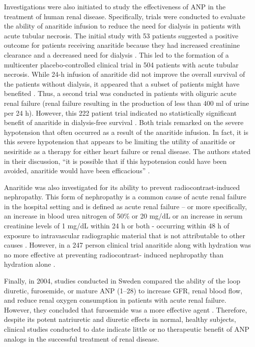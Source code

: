 \documentclass[14pt,a4paper,onecolumn]{article}
\begin{document}
Investigations were also initiated to study the effectiveness of ANP in the treatment of human renal disease. Specifically, trials were conducted to evaluate the ability of anaritide infusion to reduce the need for dialysis in patients with acute tubular necrosis. The initial study with 53 patients suggested a positive outcome for patients receiving anaritide because they had increased creatinine clearance and a decreased need for dialysis \citep{Rahman1994}. This led to the formation of a multicenter placebo-controlled clinical trial in 504 patients with acute tubular necrosis. While 24-h infusion of anaritide did not improve the overall survival of the patients without dialysis, it appeared that a subset of patients might have benefited \citep{Allgren1997}.
Thus, a second trial was conducted in patients with oliguric acute renal failure (renal failure resulting in the production of less than 400 ml of urine per 24 h). However, this 222 patient trial indicated no statistically significant benefit of anaritide in dialysis-free survival \citep{Lewis2000}. Both trials remarked on the severe hypotension that often occurred as a result of the anaritide infusion. In fact, it is this severe hypotension that appears to be limiting the utility of anaritide or nesiritide as a therapy for either heart failure or renal disease. The authors stated in their discussion, “it is possible that if this hypotension could have been avoided, anaritide would have been efficacious” \citep{Lewis2000}.

Anaritide was also investigated for its ability to prevent radiocontrast-induced nephropathy. This form of nephropathy is a common cause of acute renal failure in the hospital setting and is defined as acute renal failure – or more specifically, an increase in blood urea nitrogen of 50\% or 20 mg/dL or an increase in serum creatinine levels of 1 mg/dL within 24 h or both - occurring within 48 h of exposure to intravascular radiographic material that is not attributable to other causes \citep{Barrett1994}. However, in a 247 person clinical trial anaritide along with hydration was no more effective at preventing radiocontrast- induced nephropathy than hydration alone \citep{Kurnik1998}.

Finally, in 2004, studies conducted in Sweden compared the ability of the loop diuretic, furosemide, or mature ANP (1–28) to increase GFR, renal blood flow, and reduce renal oxygen consumption in patients with acute renal failure. However, they concluded that furosemide was a more effective agent \citep{Sward2005}. Therefore, despite its potent natriuretic and diuretic effects in normal, healthy subjects, clinical studies conducted to date indicate little or no therapeutic benefit of ANP analogs in the successful treatment of renal disease.
\end{document}
